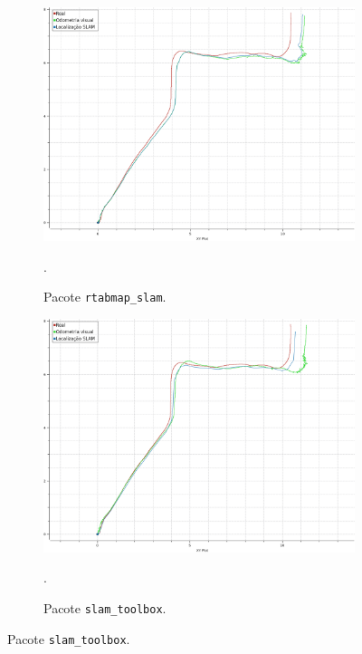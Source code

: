 \documentclass[repeatfields,xlists,xpacks,oneside,yearsonly]{ufrgscca}
\begin{document}
\begin{figure}[h]
    \caption{Sistemas de localização}
    \begin{subfigure}{0.5\linewidth}
        {
            \centering
            \caption{Pacote \texttt{rtabmap\_slam}.}
            \label{fig:localization_rtabmap}
            \includegraphics[width=0.98\linewidth]{localization-rtabmap.png}\\
        }
        {.}
    \end{subfigure}
    \begin{subfigure}{0.5\linewidth}
        {
            \centering
            \caption{Pacote \texttt{slam\_toolbox}.}
            \label{fig:localization_slam_toolbox}
            \includegraphics[width=0.98\linewidth]{localization-slam-toolbox.png}\\
        }
        {.}
    \end{subfigure}
\end{figure}
\end{document}
